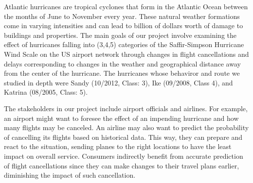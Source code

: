 
Atlantic hurricanes are tropical cyclones that form in the Atlantic Ocean between the months of June to November every year. These natural weather formations come in varying intensities and can lead to billion of dollars worth of damage to buildings and properties. The main goals of our project involve examining the effect of hurricanes falling into (3,4,5) categories of the Saffir-Simpson Hurricane Wind Scale on the US airport network through changes in flight cancellations and delays corresponding to changes in the weather and geographical distance away from the center of the hurricane. The hurricanes whose behaviror and route we studied in depth were Sandy (10/2012, Class: 3), Ike (09/2008, Class 4), and Katrina (08/2005, Class: 5). 

The stakeholders in our project include airport officials and airlines. For example, an airport might want to foresee the effect of an impending hurricane and how many flights may be canceled. An airline may also want to predict the probability of cancelling its flights based on historical data. This way, they can prepare and react to the situation, sending planes to the right locations to have the least impact on overall service. Consumers indirectly benefit from accurate prediction of flight cancellations since they can make changes to their travel plans earlier, diminishing the impact of such cancellation.
